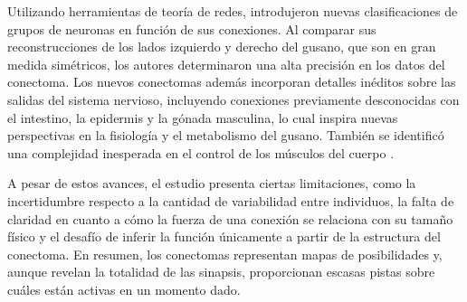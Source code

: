 Utilizando herramientas de teoría de redes, introdujeron nuevas clasificaciones de grupos de neuronas en función de sus conexiones. Al comparar sus reconstrucciones de los lados izquierdo y derecho del gusano, que son en gran medida simétricos, los autores determinaron una alta precisión en los datos del conectoma. Los nuevos conectomas además incorporan detalles inéditos sobre las salidas del sistema nervioso, incluyendo conexiones previamente desconocidas con el intestino, la epidermis y la gónada masculina, lo cual inspira nuevas perspectivas en la fisiología y el metabolismo del gusano. También se identificó una complejidad inesperada en el control de los músculos del cuerpo \cite{portman_neural_2019}. 

A pesar de estos avances, el estudio presenta ciertas limitaciones, como la incertidumbre respecto a la cantidad de variabilidad entre individuos, la falta de claridad en cuanto a cómo la fuerza de una conexión se relaciona con su tamaño físico y el desafío de inferir la función únicamente a partir de la estructura del conectoma. En resumen, los conectomas representan mapas de posibilidades y, aunque revelan la totalidad de las sinapsis, proporcionan escasas pistas sobre cuáles están activas en un momento dado. 


